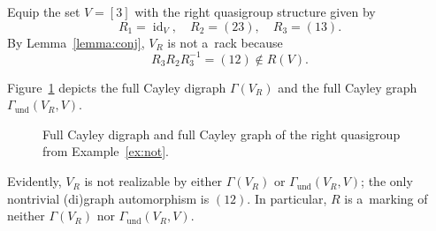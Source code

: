 \documentclass{jonasart}
\DeclareMathOperator{\id}{id}
\newcommand{\inv}{^{-1}}
\newcommand{\und}{\mathrm{und}}
\begin{document}
	\begin{example}\label{ex:not}
		Equip the set $V=[3]$ with the right quasigroup structure given by
		\[
			R_1=\id_V,\quad R_2=(23),\quad R_3=(13).
		\]
		By Lemma~\ref{lemma:conj}, $V_R$ is not a~rack because
		\[
			R_3R_2R_3\inv=(12)\notin R(V).
		\]

		Figure~\ref{fig:not} depicts the full Cayley digraph $\Gamma(V_R )$ and the full Cayley graph $\Gamma_{\und}(V_R,V)$.
		\begin{figure}[!ht]
			\centering
			\caption{Full Cayley digraph and full Cayley graph of the right quasigroup from Example~\ref{ex:not}.}
			\label{fig:not}
		\end{figure}
		Evidently, $V_R$ is not realizable by either $\Gamma(V_R )$ or $\Gamma_{\und}(V_R,V)$; the only nontrivial (di)graph automorphism is $(12)$. In particular, $R$ is a~marking of neither $\Gamma(V_R )$ nor $\Gamma_{\und}(V_R,V)$.
	\end{example}
\end{document}
